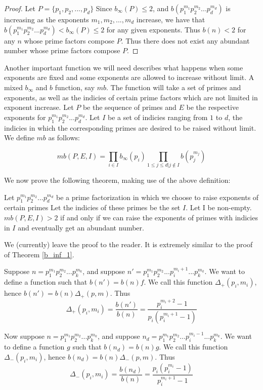 \documentclass[../paper.tex]{article}
\begin{document}
\begin{proof}
Let $P = \{p_1, p_2, ..., p_d\}$
Since $b_{\infty}(P) \leq 2$, and $b(p_1^{m_1} p_2^{m_2} ... p_d^{m_d})$
is increasing as the exponents $m_1, m_2, ..., m_d$ increase, we have that
$b(p_1^{m_1} p_2^{m_2} ... p_d^{m_d}) < b_{\infty}(P) \leq 2$ for any 
given exponents. Thus $b(n) < 2$ for any $n$ whose prime factors
compose $P$. Thus there does not exist any abundant number whose 
prime factors compose $P$.

\end{proof}

Another important function we will need describes what happens 
when some exponents are fixed and some exponents are allowed to
increase without limit. A mixed $b_{\infty}$ and $b$ function, 
say $mb$. The function will take a set of primes and exponents,
as well as the indicies of certain prime factors which are not
limited in exponent increase. Let $P$ be the sequence of primes 
and $E$ be the respective exponents for 
$p_1^{m_1} p_2^{m_2} ... p_d^{m_d}$. Let $I$ be a set of indicies
ranging from $1$ to $d$, the indicies in which the corresponding
primes are desired to be raised without limit. We define $mb$ as 
follows:

\begin{equation}\label{mb_def}
  mb(P,E,I) = \prod_{i \in I} b_{\infty}(p_i) 
  \prod_{1 \leq j \leq d | j \notin I} b(p_j^{m_j})
\end{equation}

We now prove the following theorem, making use of the above definition:

\begin{theorem}
Let $p_1^{m_1} p_2^{m_2} ... p_d^{m_d}$ be a prime factorization 
in which we choose to raise exponents of certain primes Let the 
indicies of these primes be the set $I$. Let I be non-empty.
$mb(P,E,I) > 2$ if and only if we can raise the exponents of primes with 
indicies in $I$ and eventually get an abundant number.
\end{theorem}

We (currently) leave the proof to the reader. It is extremely 
similar to the proof of Theorem {\ref{b_inf_1}}.

Suppose $n=p_1^{m_1}p_2^{m_2}...p_{k}^{m_k}$, and suppose 
$n'=p_1^{m_1}p_2^{m_2}...p_i^{m_i + 1}...p_{k}^{m_k}$. We want
to define a function such that $b(n') = b(n) f$. We call this
function $\Delta_{+}(p_i, m_i)$, hence $b(n') = b(n) \Delta_{+}(p,m)$.
Thus 
%
$$\Delta_{+}(p_i, m_i) = \frac{b(n')}{b(n)} = 
\frac{p_i^{m_i+2} - 1}{ p_i (p_i^{m_i + 1} - 1)}$$
%

	Now suppose $n=p_1^{m_1}p_2^{m_2}...p_{k}^{m_k}$, and suppose 
$n_d=p_1^{m_1}p_2^{m_2}...p_i^{m_i - 1}...p_{k}^{m_k}$. We want
to define a function $g$ such that $b(n_d) = b(n) g$. We call this
function $\Delta_{-}(p_i, m_i)$, hence $b(n_d) = b(n) \Delta_{-}(p,m)$.
Thus 
%
$$\Delta_{-}(p_i, m_i) = \frac{b(n_d)}{b(n)} = 
\frac{p_i(p_i^{m_i} - 1)}{ p_i^{m_i + 1} - 1}$$
%
\end{document}
